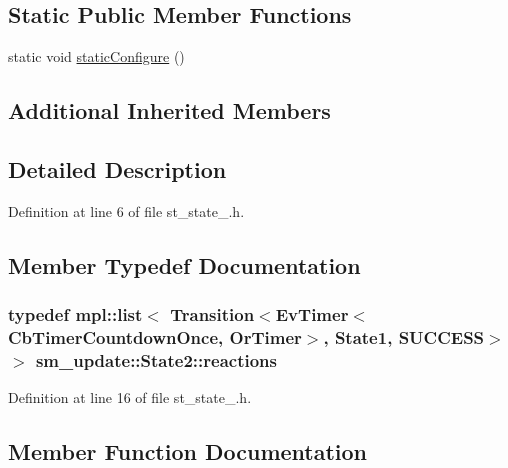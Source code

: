 \subsection*{Static Public Member Functions}
\begin{DoxyCompactItemize}
\item 
static void \hyperlink{structsm__update_1_1State2_a67d763dee03bc1de8fc52bb36d001415}{static\+Configure} ()
\end{DoxyCompactItemize}
\subsection*{Additional Inherited Members}


\subsection{Detailed Description}


Definition at line 6 of file st\+\_\+state\+\_.\+h.



\subsection{Member Typedef Documentation}
\subsubsection[{\texorpdfstring{reactions}{reactions}}]{\setlength{\rightskip}{0pt plus 5cm}typedef mpl\+::list$<$ Transition$<${\bf Ev\+Timer}$<${\bf Cb\+Timer\+Countdown\+Once}, {\bf Or\+Timer}$>$, {\bf State1}, {\bf S\+U\+C\+C\+E\+SS}$>$ $>$ {\bf sm\+\_\+update\+::\+State2\+::reactions}}\hypertarget{structsm__update_1_1State2_a6030dbce2602c3a49aae0a372e46e4df}{}\label{structsm__update_1_1State2_a6030dbce2602c3a49aae0a372e46e4df}


Definition at line 16 of file st\+\_\+state\+\_.\+h.



\subsection{Member Function Documentation}
